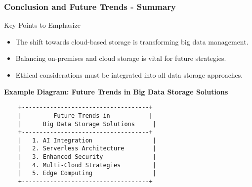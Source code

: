 \documentclass[aspectratio=169]{beamer}
\begin{document}
\begin{frame}[fragile]
    \frametitle{Conclusion and Future Trends - Summary}
    \begin{block}{Key Points to Emphasize}
        \begin{itemize}
            \item The shift towards cloud-based storage is transforming big data management.
            \item Balancing on-premises and cloud storage is vital for future strategies.
            \item Ethical considerations must be integrated into all data storage approaches.
        \end{itemize}
    \end{block}
    
    \begin{center}
        \textbf{Example Diagram: Future Trends in Big Data Storage Solutions}
    \end{center}
    \begin{verbatim}
    +------------------------------------+
    |         Future Trends in           |
    |      Big Data Storage Solutions     |
    +------------------------------------+
    |   1. AI Integration                 |
    |   2. Serverless Architecture        |
    |   3. Enhanced Security              |
    |   4. Multi-Cloud Strategies         |
    |   5. Edge Computing                 |
    +------------------------------------+
    \end{verbatim}
\end{frame}
\end{document}
